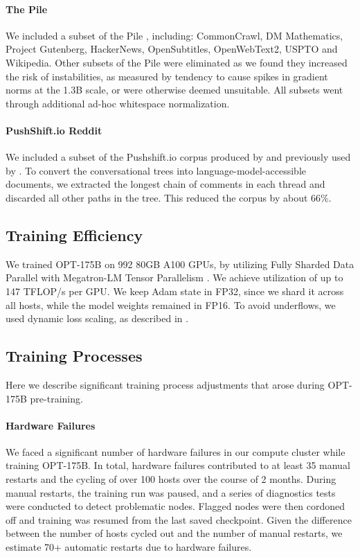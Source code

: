 \documentclass[11pt]{article}
\newcommand{\OPT}[0]{{OPT-175B}}
\begin{document}
\paragraph{The Pile} We included a subset of the Pile \cite{thepile}, including: CommonCrawl, DM Mathematics,  Project Gutenberg, HackerNews, OpenSubtitles, OpenWebText2, USPTO and Wikipedia. Other subsets of the Pile were eliminated as we found they increased the risk of instabilities, as measured by tendency to cause spikes in gradient norms at the 1.3B scale, or were otherwise deemed unsuitable.  All subsets went through additional ad-hoc whitespace normalization.

\paragraph{PushShift.io Reddit} We included a subset of the Pushshift.io corpus produced by \citet{reddit2020} and previously used by \citet{roller-etal-2021-recipes}. To convert the conversational trees into language-model-accessible documents, we extracted the longest chain of comments in each thread and discarded all other paths in the tree. This reduced the corpus by about 66\%.

\subsection{Training Efficiency}
\label{sec:training_efficiency}
We trained \OPT{} on 992 80GB A100 GPUs, by utilizing Fully Sharded Data Parallel \cite{1TMoE2021} with Megatron-LM Tensor Parallelism \cite{shoeybi2019megatron}. We achieve utilization of up to 147 TFLOP/s per GPU. We keep Adam state in FP32, since we shard it across all hosts, while the model weights remained in FP16. To avoid underflows, we used dynamic loss scaling, as described in \citet{micikevicius2017mixed}.

\subsection{Training Processes}
Here we describe significant training process adjustments that arose during \OPT{} pre-training.

\label{sec:training_process}
\paragraph{Hardware Failures} 
We faced a significant number of hardware failures in our compute cluster while training \OPT{}. In total, hardware failures contributed to at least 35 manual restarts and the cycling of over 100 hosts over the course of 2 months. During manual restarts, the training run was paused, and a series of diagnostics tests were conducted to detect problematic nodes. Flagged nodes were then cordoned off and training was resumed from the last saved checkpoint. Given the difference between the number of hosts cycled out and the number of manual restarts, we estimate 70+ automatic restarts due to hardware failures. 
\end{document}
